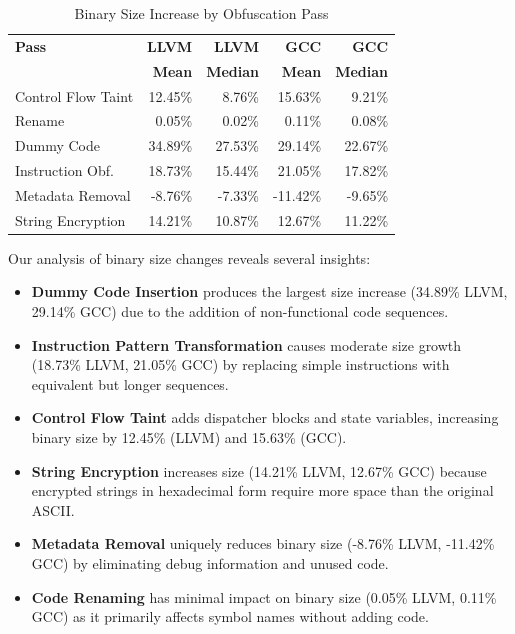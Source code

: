 \documentclass[conference]{IEEEtran}
\begin{document}
\begin{table}[ht!]
\centering
\footnotesize
\caption{Binary Size Increase by Obfuscation Pass}
\begin{tabular}{|l|r|r|r|r|}
\hline
\textbf{Pass} & \textbf{LLVM} & \textbf{LLVM} & \textbf{GCC} & \textbf{GCC} \\
 & \textbf{Mean} & \textbf{Median} & \textbf{Mean} & \textbf{Median} \\
\hline
Control Flow Taint & 12.45\% & 8.76\% & 15.63\% & 9.21\% \\
Rename & 0.05\% & 0.02\% & 0.11\% & 0.08\% \\
Dummy Code & 34.89\% & 27.53\% & 29.14\% & 22.67\% \\
Instruction Obf. & 18.73\% & 15.44\% & 21.05\% & 17.82\% \\
Metadata Removal & -8.76\% & -7.33\% & -11.42\% & -9.65\% \\
String Encryption & 14.21\% & 10.87\% & 12.67\% & 11.22\% \\
\hline
\end{tabular}
\label{tab:binary-size}
\end{table}

Our analysis of binary size changes reveals several insights:

\begin{itemize}
    \item \textbf{Dummy Code Insertion} produces the largest size increase (34.89\% LLVM, 29.14\% GCC) due to the addition of non-functional code sequences.
    
    \item \textbf{Instruction Pattern Transformation} causes moderate size growth (18.73\% LLVM, 21.05\% GCC) by replacing simple instructions with equivalent but longer sequences.
    
    \item \textbf{Control Flow Taint} adds dispatcher blocks and state variables, increasing binary size by 12.45\% (LLVM) and 15.63\% (GCC).
    
    \item \textbf{String Encryption} increases size (14.21\% LLVM, 12.67\% GCC) because encrypted strings in hexadecimal form require more space than the original ASCII.
    
    \item \textbf{Metadata Removal} uniquely reduces binary size (-8.76\% LLVM, -11.42\% GCC) by eliminating debug information and unused code.
    
    \item \textbf{Code Renaming} has minimal impact on binary size (0.05\% LLVM, 0.11\% GCC) as it primarily affects symbol names without adding code.
\end{itemize}
\end{document}
